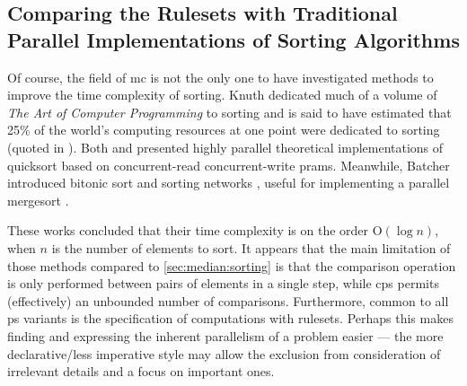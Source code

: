 
\subsection{Comparing the  Rulesets with Traditional Parallel Implementations of Sorting Algorithms}

Of course, the field of \gls{mc} is not the only one to have investigated methods to improve the time complexity of sorting.  Knuth dedicated much of a volume of \textit{The Art of Computer Programming} to sorting \cite{Knuth1998} and is said to have estimated that 25\% of the world's computing resources at one point were dedicated to sorting (quoted in \cite{Powers1991}).  Both \citeauthor{Powers1991} \cite{Powers1991} and \citeauthor{Chlebus1991} \cite{Chlebus1991} presented highly parallel theoretical implementations of quicksort based on concurrent-read concurrent-write \glspl{pram}.  Meanwhile, Batcher introduced bitonic sort and sorting networks \cite{Akl2011}, useful for implementing a parallel mergesort \cite{Lee1995}.

These works concluded that their time complexity is on the order O\((\log n)\), when \(n\) is the number of elements to sort.  It appears that the main limitation of those methods compared to \cref{sec:median:sorting} is that the comparison operation is only performed between pairs of elements in a single step, while \gls{cps} permits (effectively) an unbounded number of comparisons.  Furthermore, common to all \gls{ps} variants is the specification of computations with \glspl{ruleset}.  Perhaps this makes finding and expressing the inherent parallelism of a problem easier --- the more declarative/less imperative style may allow the exclusion from consideration of irrelevant details and a focus on important ones.
